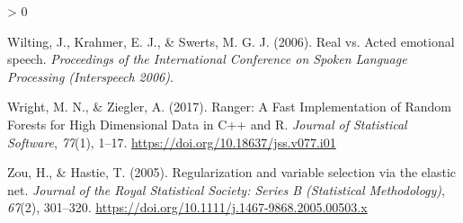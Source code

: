 \documentclass[
  english,
  man,floatsintext]{apa6}
\newlength{\cslhangindent}
\newenvironment{CSLReferences}[2] %
 {%
  \setlength{\parindent}{0pt}
  \ifodd #1 \everypar{\setlength{\hangindent}{\cslhangindent}}\ignorespaces\fi
  \ifnum #2 > 0
  \setlength{\parskip}{#2\baselineskip}
  \fi
 }%
 {}
\begin{document}
\begin{CSLReferences}{1}{0}
\leavevmode\hypertarget{ref-wiltingRealVsActed2006}{}%
Wilting, J., Krahmer, E. J., \& Swerts, M. G. J. (2006). Real vs. Acted emotional speech. \emph{Proceedings of the International Conference on Spoken Language Processing (Interspeech 2006)}.

\leavevmode\hypertarget{ref-wrightRangerFastImplementation2017}{}%
Wright, M. N., \& Ziegler, A. (2017). Ranger: A {Fast Implementation} of {Random Forests} for {High Dimensional Data} in {C}++ and {R}. \emph{Journal of Statistical Software}, \emph{77}(1), 1--17. \url{https://doi.org/10.18637/jss.v077.i01}

\leavevmode\hypertarget{ref-zouRegularizationVariableSelection2005}{}%
Zou, H., \& Hastie, T. (2005). Regularization and variable selection via the elastic net. \emph{Journal of the Royal Statistical Society: Series B (Statistical Methodology)}, \emph{67}(2), 301--320. \url{https://doi.org/10.1111/j.1467-9868.2005.00503.x}

\end{CSLReferences}

\endgroup
\end{document}
